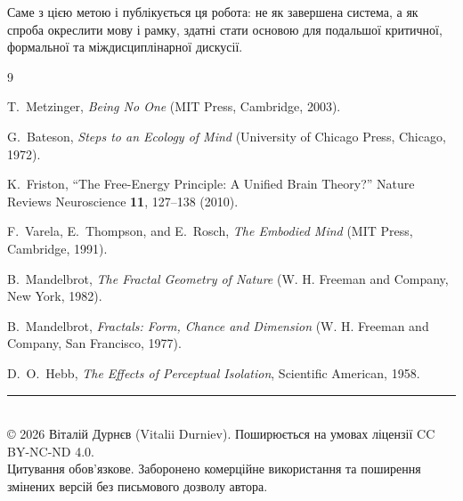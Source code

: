 \documentclass[aps,prd,onecolumn,nofootinbib,superscriptaddress]{revtex4-2}
\begin{document}
Саме з цією метою і публікується ця робота: не як завершена система, а як спроба окреслити мову і рамку, здатні стати основою для подальшої критичної, формальної та міждисциплінарної дискусії.


\begin{thebibliography}{9}

    T.~Metzinger,
    \textit{Being No One}
    (MIT Press, Cambridge, 2003).

    G.~Bateson,
    \textit{Steps to an Ecology of Mind}
    (University of Chicago Press, Chicago, 1972).

    K.~Friston,
    ``The Free-Energy Principle: A Unified Brain Theory?''
    Nature Reviews Neuroscience \textbf{11}, 127--138 (2010).

    F.~Varela, E.~Thompson, and E.~Rosch,
    \textit{The Embodied Mind}
    (MIT Press, Cambridge, 1991).

    B.~Mandelbrot,
    \textit{The Fractal Geometry of Nature}
    (W. H. Freeman and Company, New York, 1982).

    B.~Mandelbrot,
    \textit{Fractals: Form, Chance and Dimension}
    (W. H. Freeman and Company, San Francisco, 1977).

    D.~O.~Hebb,
    \textit{The Effects of Perceptual Isolation},
    Scientific American, 1958.
\end{thebibliography}

\vfill %
\begin{center}
    \rule{0.5\textwidth}{.4pt} \\ %
    \vspace{2mm}
    \footnotesize
    © 2026 Віталій Дурнєв (Vitalii Durniev). Поширюється на умовах ліцензії CC BY-NC-ND 4.0. \\
    Цитування обов’язкове. Заборонено комерційне використання та поширення змінених версій без письмового дозволу автора.
\end{center}
\end{document}
